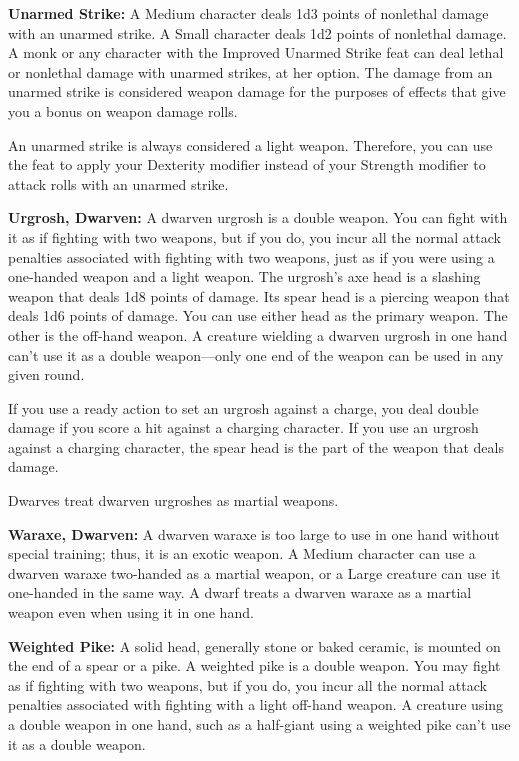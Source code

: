 \textbf{Unarmed Strike:} A Medium character deals 1d3 points of nonlethal damage with an unarmed strike. A Small character deals 1d2 points of nonlethal damage. A monk or any character with the Improved Unarmed Strike feat can deal lethal or nonlethal damage with unarmed strikes, at her option. The damage from an unarmed strike is considered weapon damage for the purposes of effects that give you a bonus on weapon damage rolls.

An unarmed strike is always considered a light weapon. Therefore, you can use the  feat to apply your Dexterity modifier instead of your Strength modifier to attack rolls with an unarmed strike. 

\textbf{Urgrosh, Dwarven:} A dwarven urgrosh is a double weapon. You can fight with it as if fighting with two weapons, but if you do, you incur all the normal attack penalties associated with fighting with two weapons, just as if you were using a one-handed weapon and a light weapon. The urgrosh's axe head is a slashing weapon that deals 1d8 points of damage. Its spear head is a piercing weapon that deals 1d6 points of damage. You can use either head as the primary weapon. The other is the off-hand weapon. A creature wielding a dwarven urgrosh in one hand can't use it as a double weapon---only one end of the weapon can be used in any given round.

If you use a ready action to set an urgrosh against a charge, you deal double damage if you score a hit against a charging character. If you use an urgrosh against a charging character, the spear head is the part of the weapon that deals damage.

Dwarves treat dwarven urgroshes as martial weapons. 

\textbf{Waraxe, Dwarven:} A dwarven waraxe is too large to use in one hand without special training; thus, it is an exotic weapon. A Medium character can use a dwarven waraxe two-handed as a martial weapon, or a Large creature can use it one-handed in the same way. A dwarf treats a dwarven waraxe as a martial weapon even when using it in one hand. 

\textbf{Weighted Pike:} A solid head, generally stone or baked ceramic, is mounted on the end of a spear or a pike. A weighted pike is a double weapon. You may fight as if fighting with two weapons, but if you do, you incur all the normal attack penalties associated with fighting with a light off-hand weapon. A creature using a double weapon in one hand, such as a half-giant using a weighted pike can't use it as a double weapon.

